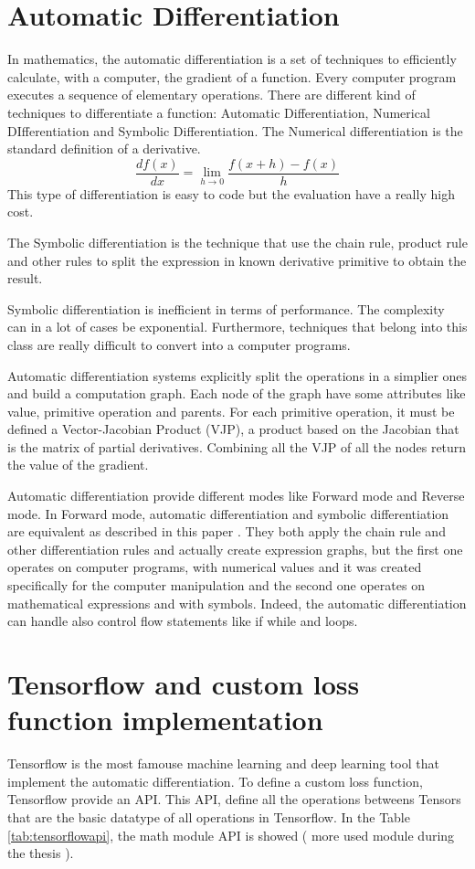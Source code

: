 \documentclass[12pt]{report}
\begin{document}
\section{Automatic Differentiation}
In mathematics, the automatic differentiation is a set of techniques to efficiently calculate, with a computer, the gradient of a function.
Every computer program executes a sequence of elementary operations.
There are different kind of techniques to differentiate a function: Automatic Differentiation, Numerical DIfferentiation and Symbolic Differentiation.
The Numerical differentiation is the standard definition of a derivative.
\begin{equation}
    \frac{df(x)}{dx} = \lim_{h \to 0} \frac{f(x+h) - f(x)}{h}
\end{equation}
%
This type of differentiation is easy to code but the evaluation have a really high cost.

The Symbolic differentiation is the technique that use the chain rule, product rule and other rules to 
split the expression in known derivative primitive to obtain the result.

Symbolic differentiation is inefficient in terms of performance. The complexity can in a lot of cases be exponential.
Furthermore, techniques that belong into this class are really difficult to convert into a computer programs.

Automatic differentiation systems explicitly split the operations in a simplier ones and build a computation graph.
Each node of the graph have some attributes like value, primitive operation and parents.
For each primitive operation, it must be defined a Vector-Jacobian Product (VJP), a product based on the Jacobian
that is the matrix of partial derivatives. Combining all the VJP of all the nodes return the value of the gradient.

Automatic differentiation provide different modes like Forward mode and Reverse mode.
In Forward mode, automatic differentiation and symbolic differentiation are equivalent as described in this paper \cite{auto_symbol}.
They both apply the chain rule and other differentiation rules and actually create expression graphs,
but the first one operates on computer programs, with numerical values and it was created specifically for the computer manipulation and 
the second one operates on mathematical expressions and with symbols.
Indeed, the automatic differentiation can handle also control flow statements like if while and loops.

\section{Tensorflow and custom loss function implementation}
Tensorflow is the most famouse machine learning and deep learning tool that implement the automatic differentiation.
To define a custom loss function, Tensorflow provide an API. This API, define all the operations betweens Tensors that are the basic datatype of all operations in Tensorflow.
In the Table \ref{tab:tensorflowapi}, the math module API is showed ( more used module during the thesis ).
\end{document}
